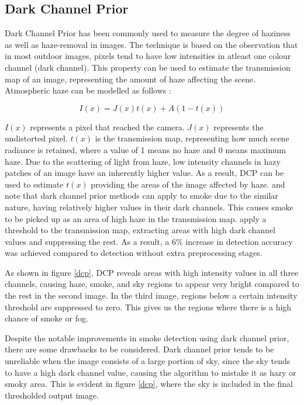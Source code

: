 \documentclass[lettersize,journal]{IEEEtran}
\begin{document}
\subsection{Dark Channel Prior}

Dark Channel Prior has been commonly used to measure the degree of
haziness as well as haze-removal in images. The technique is based on
the observation that in most outdoor images, pixels tend to have low
intensities in atleast one colour channel (dark channel). This property
can be used to estimate the transmission map of an image, representing
the amount of haze affecting the scene. Atmospheric haze can be modelled
as follows \cite{darkchannelprior}:

\[I(x) = J(x)t(x) + A\left( 1 - t(x) \right)\]

\(I(x)\) represents a pixel that reached the camera. \(J(x)\) represents
the undistorted pixel. \(t(x)\) is the transmission map, representing
how much scene radiance is retained, where a value of 1 means no haze
and 0 means maximum haze. Due to the scattering of light from haze, low
intensity channels in hazy patches of an image have an inherently higher
value. As a result, DCP can be used to estimate \(t(x)\) providing the
areas of the image affected by haze. \cite{prepfire} and \cite{dcpsmoke}
note that dark channel prior methods can apply to smoke due to the
similar nature, having relatively higher values in their dark channels.
This causes smoke to be picked up as an area of high haze in the
transmission map. \cite{prepfire} apply a threshold to the transmission
map, extracting areas with high dark channel values and suppressing the
rest. As a result, a 6\% increase in detection accuracy was achieved
compared to detection without extra preprocessing stages.

As shown in figure \ref{dcp}, DCP reveals areas with high
intensity values in all three channels, causing haze, smoke, and sky
regions to appear very bright compared to the rest in the second image.
In the third image, regions below a certain intensity threshold are
suppressed to zero. This gives us the regions where there is a high
chance of smoke or fog.

Despite the notable improvements in smoke detection using dark channel
prior, there are some drawbacks to be considered. Dark channel prior
tends to be unreliable when the image consists of a large portion of
sky, since the sky tends to have a high dark channel value, causing the
algorithm to mistake it as hazy or smoky area. This is evident in
figure \ref{dcp}, where the sky is included in the final
thresholded output image.
\end{document}
